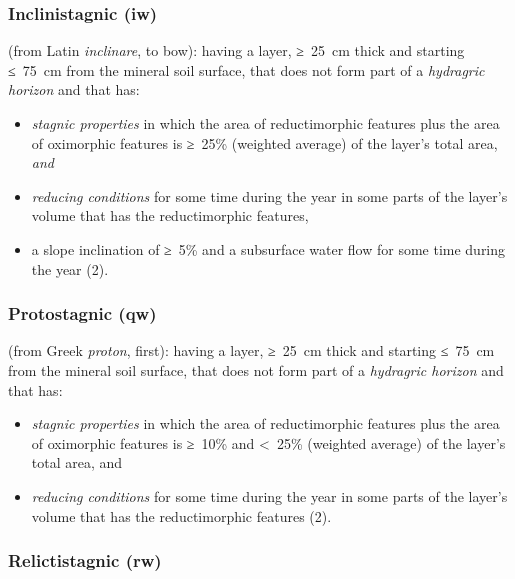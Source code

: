 \documentclass[
  letterpaper,
  DIV=11,
  numbers=noendperiod]{scrreprt}
\providecommand{\tightlist}{%
  \setlength{\itemsep}{0pt}\setlength{\parskip}{0pt}}\usepackage{longtable,booktabs,array}
\begin{document}
\hypertarget{inclinistagnic-iw}{%
\subsubsection{Inclinistagnic (iw)}\label{inclinistagnic-iw}}

(from Latin \emph{inclinare}, to bow): having a layer, ≥~25~cm thick and
starting ≤~75~cm from the mineral soil surface, that does not form part
of a \emph{hydragric horizon} and that has:

\begin{itemize}
\tightlist
\item
  \emph{stagnic properties} in which the area of reductimorphic features
  plus the area of oximorphic features is ≥~25\% (weighted average) of
  the layer's total area, \emph{and}
\item
  \emph{reducing conditions} for some time during the year in some parts
  of the layer's volume that has the reductimorphic features,
\item
  a slope inclination of ≥~5\% and a subsurface water flow for some time
  during the year (2).
\end{itemize}

\hypertarget{protostagnic-qw}{%
\subsubsection{Protostagnic (qw)}\label{protostagnic-qw}}

(from Greek \emph{proton}, first): having a layer, ≥~25~cm thick and
starting ≤~75~cm from the mineral soil surface, that does not form part
of a \emph{hydragric horizon} and that has:

\begin{itemize}
\tightlist
\item
  \emph{stagnic properties} in which the area of reductimorphic features
  plus the area of oximorphic features is ≥~10\% and \textless~25\%
  (weighted average) of the layer's total area, and
\item
  \emph{reducing conditions} for some time during the year in some parts
  of the layer's volume that has the reductimorphic features (2).
\end{itemize}

\hypertarget{relictistagnic-rw}{%
\subsubsection{Relictistagnic (rw)}\label{relictistagnic-rw}}
\end{document}
